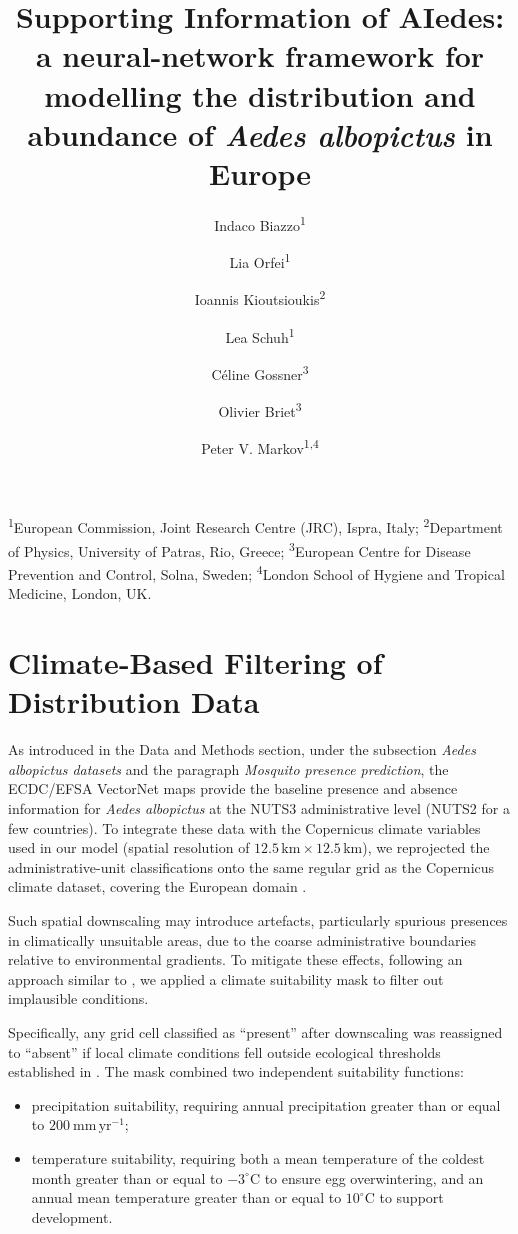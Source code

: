 \documentclass[11pt,a4paper]{article}
\title{Supporting Information of AIedes: a neural-network framework for modelling the distribution and abundance of \textit{Aedes albopictus} in Europe}
\author{%
Indaco Biazzo\textsuperscript{1} \and
Lia Orfei\textsuperscript{1} \and
Ioannis Kioutsioukis\textsuperscript{2} \and
Lea Schuh\textsuperscript{1} \and
Céline Gossner\textsuperscript{3} \and
Olivier Briet\textsuperscript{3} \and
Peter V. Markov\textsuperscript{1,4}
}
\date{} %
\begin{document}
\maketitle

{\fontsize{7pt}{8pt}\selectfont\linespread{0.8}\noindent
\textsuperscript{1}European Commission, Joint Research Centre (JRC), Ispra, Italy; 
\textsuperscript{2}Department of Physics, University of Patras, Rio, Greece; 
\textsuperscript{3}European Centre for Disease Prevention and Control, Solna, Sweden; 
\textsuperscript{4}London School of Hygiene and Tropical Medicine, London, UK.
}

\section{Climate-Based Filtering of Distribution Data}

As introduced in the Data and Methods section, under the subsection \textit{Aedes albopictus datasets} and the paragraph \textit{Mosquito presence prediction}, the ECDC/EFSA VectorNet maps \cite{ecdc2024b, Wint2023} provide the baseline presence and absence information for \emph{Aedes albopictus} at the NUTS3 administrative level (NUTS2 for a few countries). To integrate these data with the Copernicus climate variables used in our model (spatial resolution of $12.5\,\text{km} \times 12.5\,\text{km}$), we reprojected the administrative-unit classifications onto the same regular grid as the Copernicus climate dataset, covering the European domain \cite{biazzo2026_datasets}.

Such spatial downscaling may introduce artefacts, particularly spurious presences in climatically unsuitable areas, due to the coarse administrative boundaries relative to environmental gradients. To mitigate these effects, following an approach similar to \cite{zardini2024}, we applied a climate suitability mask to filter out implausible conditions.

Specifically, any grid cell classified as ``present'' after downscaling was reassigned to ``absent'' if local climate conditions fell outside ecological thresholds established in \cite{ecdc2024a}. The mask combined two independent suitability functions:
\begin{itemize}
    \item precipitation suitability, requiring annual precipitation greater than or equal to $200~\text{mm}\,\text{yr}^{-1}$;
    \item temperature suitability, requiring both a mean temperature of the coldest month greater than or equal to $-3^{\circ}\text{C}$ to ensure egg overwintering, and an annual mean temperature greater than or equal to $10^{\circ}\text{C}$ to support development.
\end{itemize}
\end{document}
